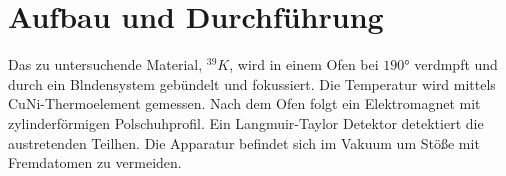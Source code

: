 \section{Aufbau und Durchführung}
\label{sec:Durchführung}
Das zu untersuchende Material, $^39K$, wird in einem Ofen bei $190\si{\degree}$
verdmpft und durch ein Blndensystem gebündelt und fokussiert.
Die Temperatur wird mittels CuNi-Thermoelement gemessen.
Nach dem Ofen folgt ein Elektromagnet mit zylinderförmigen Polschuhprofil.
Ein Langmuir-Taylor Detektor detektiert die austretenden Teilhen.
Die Apparatur befindet sich im Vakuum um Stöße mit Fremdatomen zu vermeiden.
